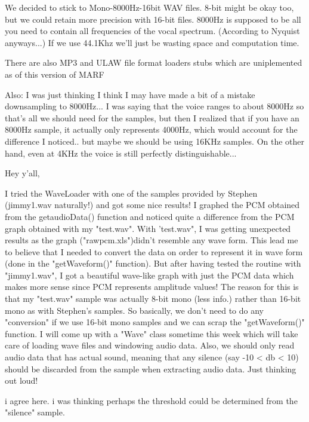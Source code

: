 
\par
	We decided to stick to Mono-8000Hz-16bit WAV files.  8-bit might be
	okay too, but we could retain more precision with 16-bit files.  8000Hz is
	supposed to be all you need to contain all frequencies of the vocal
	spectrum.
	(According to Nyquist anyways...)  If we use 44.1Khz we'll just be wasting
	space and computation time.

\par
	There are also MP3 and ULAW file format loaders stubs which are uniplemented
	as of this version of MARF

\par
Also: I was just thinking I think I may have made a bit of a mistake
downsampling to 8000Hz... I was saying that the voice ranges to about 8000Hz so
that's all we should need for the samples, but then I realized that if you have
an 8000Hz sample, it actually only represents 4000Hz, which would account for
the difference I noticed.. but maybe we should be using 16KHz samples.  On the
other hand, even at 4KHz the voice is still perfectly distinguishable...

\par
Hey y'all,

\par
I tried the WaveLoader with one of the samples provided by Stephen
(jimmy1.wav naturally!) and got some nice results! I graphed the PCM
obtained from the getaudioData() function and noticed quite a difference
from the PCM graph obtained with my "test.wav". With 'test.wav", I was
getting unexpected results as the graph ("rawpcm.xls")didn't resemble any
wave form. This lead me to believe that I needed to convert the data on
order to represent it in wave form (done in the "getWaveform()" function).
But after having tested the routine with "jimmy1.wav", I got a beautiful
wave-like graph with just the PCM data which makes more sense since PCM
represents amplitude values! The reason for this is that my "test.wav"
sample was actually 8-bit mono (less info.) rather than 16-bit mono as with
Stephen's samples. So basically, we don't need to do any "conversion" if we
use 16-bit mono samples and we can scrap the "getWaveform()" function.
I will come up with a "Wave" class sometime this week which will take care
of loading wave files and windowing audio data. Also, we should only read
audio data that has actual sound, meaning that any silence (say -10 < db <
10) should be discarded from the sample when extracting audio data.
Just thinking out loud!


\par
i agree here.  i was thinking perhaps the threshold could be determined from
the "silence" sample.

